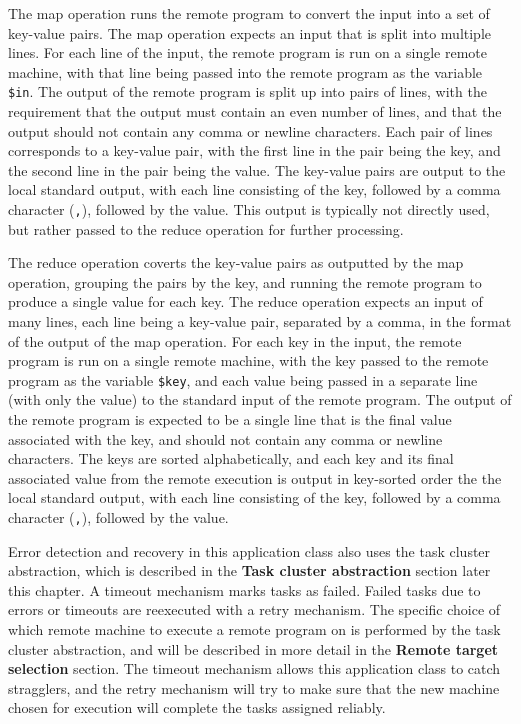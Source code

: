 \documentclass[oneside]{report}
\begin{document}
The map operation runs the remote program to convert the input into a set of key-value pairs.
The map operation expects an input that is split into multiple lines.
For each line of the input, the remote program is run on a single remote machine, with that line being passed into the remote program as the variable \texttt{\$in}.
The output of the remote program is split up into pairs of lines, with the requirement that the output must contain an even number of lines, and that the output should not contain any comma or newline characters.
Each pair of lines corresponds to a key-value pair, with the first line in the pair being the key, and the second line in the pair being the value.
The key-value pairs are output to the local standard output, with each line consisting of the key, followed by a comma character (\texttt{,}), followed by the value.
This output is typically not directly used, but rather passed to the reduce operation for further processing.

The reduce operation coverts the key-value pairs as outputted by the map operation, grouping the pairs by the key, and running the remote program to produce a single value for each key.
The reduce operation expects an input of many lines, each line being a key-value pair, separated by a comma, in the format of the output of the map operation.
For each key in the input, the remote program is run on a single remote machine, with the key passed to the remote program as the variable \texttt{\$key}, and each value being passed in a separate line (with only the value) to the standard input of the remote program.
The output of the remote program is expected to be a single line that is the final value associated with the key, and should not contain any comma or newline characters.
The keys are sorted alphabetically, and each key and its final associated value from the remote execution is output in key-sorted order the the local standard output, with each line consisting of the key, followed by a comma character (\texttt{,}), followed by the value.

Error detection and recovery in this application class also uses the task cluster abstraction, which is described in the \textbf{Task cluster abstraction} section later this chapter.
A timeout mechanism marks tasks as failed.
Failed tasks due to errors or timeouts are reexecuted with a retry mechanism.
The specific choice of which remote machine to execute a remote program on is performed by the task cluster abstraction, and will be described in more detail in the \textbf{Remote target selection} section.
The timeout mechanism allows this application class to catch stragglers, and the retry mechanism will try to make sure that the new machine chosen for execution will complete the tasks assigned reliably.
\end{document}

